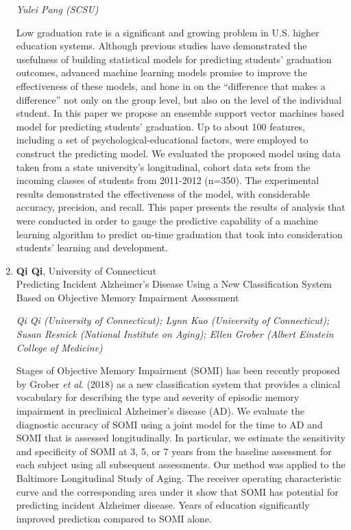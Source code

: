 \begin{enumerate}
\emph{\footnotesize Yulei Pang (SCSU)}

Low graduation rate is a significant and growing problem in U.S. higher education systems. Although previous studies have demonstrated the usefulness of building statistical models for predicting students’ graduation outcomes, advanced machine learning models promise to improve the effectiveness of these models, and hone in on the “difference that makes a difference” not only on the group level, but also on the level of the individual student. In this paper we propose an ensemble support vector machines based model for predicting students’ graduation. Up to about 100 features, including a set of psychological-educational factors, were employed to construct the predicting model. We evaluated the proposed model using data taken from a state university’s longitudinal, cohort data sets from the incoming classes of students from 2011-2012 (n=350). The experimental results demonstrated the effectiveness of the model, with considerable accuracy, precision, and recall. This paper presents the results of analysis that were conducted in order to gauge the predictive capability of a machine learning algorithm to predict on-time graduation that took into consideration students’ learning and development.

\item \textbf{Qi Qi}, University of Connecticut \\
Predicting Incident Alzheimer's Disease Using a New Classification System Based on Objective Memory Impairment Assessment

\emph{\footnotesize Qi Qi (University of Connecticut); Lynn Kuo (University of Connecticut); Susan Resnick (National Institute on Aging); Ellen Grober (Albert Einstein College of Medicine)}

Stages of Objective Memory Impairment (SOMI) has been recently proposed by Grober \textit{et al}. (2018) as a new classification system that provides a clinical vocabulary for describing the type and severity of episodic memory impairment in preclinical Alzheimer's disease (AD). We evaluate the diagnostic accuracy of SOMI using a joint model for the time to AD and SOMI that is assessed longitudinally. In particular, we estimate the sensitivity and specificity of SOMI at 3, 5, or 7 years from the baseline assessment for each subject using all subsequent assessments. Our method was applied to the Baltimore Longitudinal Study of Aging. The receiver operating characteristic curve and the corresponding area under it show that SOMI has potential for predicting incident Alzheimer disease. Years of education significantly improved prediction compared to SOMI alone.


\end{enumerate}
